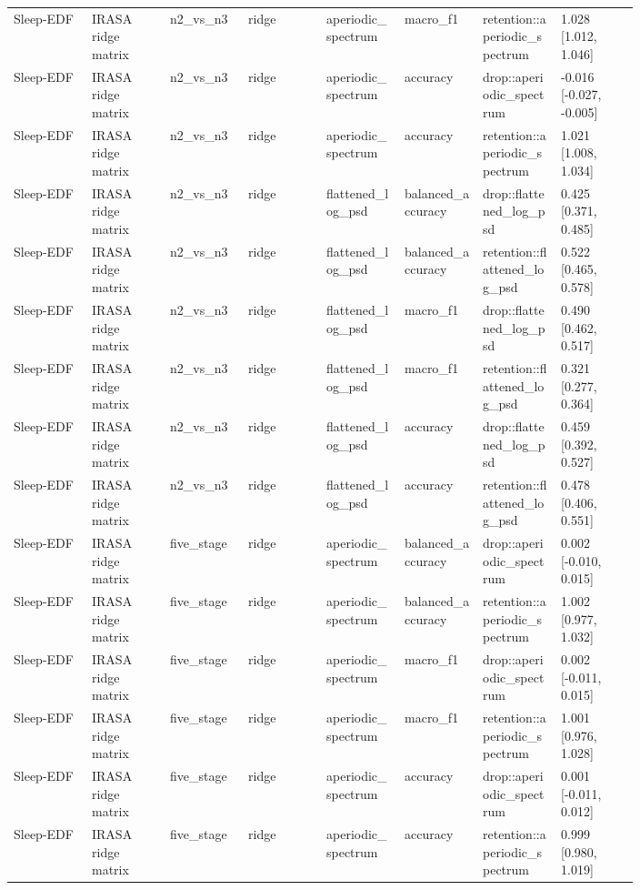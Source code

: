 \begin{longtable}{p{0.10\linewidth}p{0.10\linewidth}p{0.10\linewidth}p{0.10\linewidth}p{0.10\linewidth}p{0.10\linewidth}p{0.10\linewidth}p{0.10\linewidth}}
Sleep-EDF & IRASA ridge matrix & n2\_vs\_n3 & ridge & aperiodic\_spectrum & macro\_f1 & retention::aperiodic\_spectrum & 1.028 [1.012, 1.046]\\
Sleep-EDF & IRASA ridge matrix & n2\_vs\_n3 & ridge & aperiodic\_spectrum & accuracy & drop::aperiodic\_spectrum & -0.016 [-0.027, -0.005]\\
Sleep-EDF & IRASA ridge matrix & n2\_vs\_n3 & ridge & aperiodic\_spectrum & accuracy & retention::aperiodic\_spectrum & 1.021 [1.008, 1.034]\\
Sleep-EDF & IRASA ridge matrix & n2\_vs\_n3 & ridge & flattened\_log\_psd & balanced\_accuracy & drop::flattened\_log\_psd & 0.425 [0.371, 0.485]\\
Sleep-EDF & IRASA ridge matrix & n2\_vs\_n3 & ridge & flattened\_log\_psd & balanced\_accuracy & retention::flattened\_log\_psd & 0.522 [0.465, 0.578]\\
Sleep-EDF & IRASA ridge matrix & n2\_vs\_n3 & ridge & flattened\_log\_psd & macro\_f1 & drop::flattened\_log\_psd & 0.490 [0.462, 0.517]\\
Sleep-EDF & IRASA ridge matrix & n2\_vs\_n3 & ridge & flattened\_log\_psd & macro\_f1 & retention::flattened\_log\_psd & 0.321 [0.277, 0.364]\\
Sleep-EDF & IRASA ridge matrix & n2\_vs\_n3 & ridge & flattened\_log\_psd & accuracy & drop::flattened\_log\_psd & 0.459 [0.392, 0.527]\\
Sleep-EDF & IRASA ridge matrix & n2\_vs\_n3 & ridge & flattened\_log\_psd & accuracy & retention::flattened\_log\_psd & 0.478 [0.406, 0.551]\\
Sleep-EDF & IRASA ridge matrix & five\_stage & ridge & aperiodic\_spectrum & balanced\_accuracy & drop::aperiodic\_spectrum & 0.002 [-0.010, 0.015]\\
Sleep-EDF & IRASA ridge matrix & five\_stage & ridge & aperiodic\_spectrum & balanced\_accuracy & retention::aperiodic\_spectrum & 1.002 [0.977, 1.032]\\
Sleep-EDF & IRASA ridge matrix & five\_stage & ridge & aperiodic\_spectrum & macro\_f1 & drop::aperiodic\_spectrum & 0.002 [-0.011, 0.015]\\
Sleep-EDF & IRASA ridge matrix & five\_stage & ridge & aperiodic\_spectrum & macro\_f1 & retention::aperiodic\_spectrum & 1.001 [0.976, 1.028]\\
Sleep-EDF & IRASA ridge matrix & five\_stage & ridge & aperiodic\_spectrum & accuracy & drop::aperiodic\_spectrum & 0.001 [-0.011, 0.012]\\
Sleep-EDF & IRASA ridge matrix & five\_stage & ridge & aperiodic\_spectrum & accuracy & retention::aperiodic\_spectrum & 0.999 [0.980, 1.019]\\

\end{longtable}
